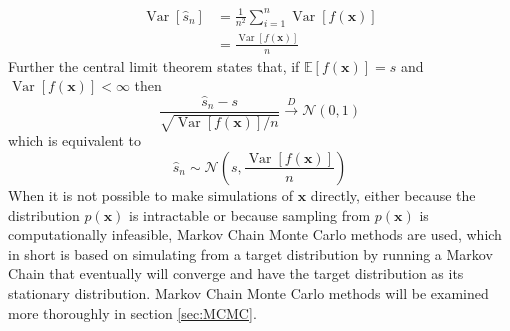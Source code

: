 \begin{equation*}
    \begin{split}
\operatorname{Var}\left[\hat{s}_{n}\right] &=\frac{1}{n^{2}} \sum_{i=1}^{n} \operatorname{Var}[f(\mathbf{x})] \\
&=\frac{\operatorname{Var}[f(\mathbf{x})]}{n}
\end{split}
\end{equation*}
Further the central limit theorem states that, if $\mathbb{E}[f(\mathbf{x})]=s$ and $\operatorname{Var}[f(\mathbf{x})]<\infty$ then
\begin{equation*}
    \frac{\hat{s}_{n}-s}{\sqrt{\operatorname{Var}[f(\mathbf{x})] / n}} \stackrel{D}{\rightarrow} \mathcal{N}(0,1)
\end{equation*}
which is equivalent to
\begin{equation*}
    \hat{s}_n\sim \mathcal{N}\left(s,\frac{\operatorname{Var}[f(\mathbf{x})]}{n}\right)
\end{equation*}
When it is not possible to make simulations of $\mathbf{x}$ directly, either because the distribution $p(\mathbf{x})$ is intractable or because sampling from $p(\mathbf{x})$ is computationally infeasible, Markov Chain Monte Carlo methods are used, which in short is based on simulating from a target distribution by running a Markov Chain that eventually will converge and have the target distribution as its stationary distribution. Markov Chain Monte Carlo methods will be examined more thoroughly in section \ref{sec:MCMC}.




